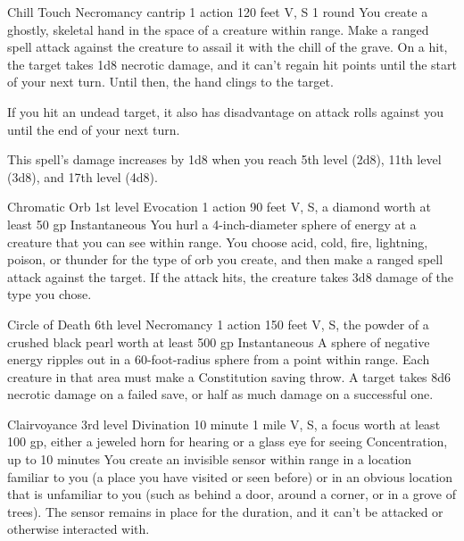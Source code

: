 \documentclass[10pt,a4paper,twoside,bg=print,twocolumn,openany,nodeprecatedcode]{dndbook}
\begin{document}


\DndSpellHeader%
{Chill Touch}
{Necromancy cantrip}
{1 action}
{120 feet}
{V, S}
{1 round}
You create a ghostly, skeletal hand in the space of a creature within range. Make a ranged spell attack against the creature to assail it with the chill of the grave. On a hit, the target takes 1d8 necrotic damage, and it can't regain hit points until the start of your next turn. Until then, the hand clings to the target.

If you hit an undead target, it also has disadvantage on attack rolls against you until the end of your next turn.

This spell's damage increases by 1d8 when you reach 5th level (2d8), 11th level (3d8), and 17th level (4d8).



\DndSpellHeader%
{Chromatic Orb}
{1st level Evocation}
{1 action}
{90 feet}
{V, S, a diamond worth at least 50 gp}
{Instantaneous}
You hurl a 4-inch-diameter sphere of energy at a creature that you can see within range. You choose acid, cold, fire, lightning, poison, or thunder for the type of orb you create, and then make a ranged spell attack against the target. If the attack hits, the creature takes 3d8 damage of the type you chose.



\DndSpellHeader%
{Circle of Death}
{6th level Necromancy}
{1 action}
{150 feet}
{V, S, the powder of a crushed black pearl worth at least 500 gp}
{Instantaneous}
A sphere of negative energy ripples out in a 60-foot-radius sphere from a point within range. Each creature in that area must make a Constitution saving throw. A target takes 8d6 necrotic damage on a failed save, or half as much damage on a successful one.



\DndSpellHeader%
{Clairvoyance}
{3rd level Divination}
{10 minute}
{1 mile}
{V, S, a focus worth at least 100 gp, either a jeweled horn for hearing or a glass eye for seeing}
{Concentration, up to 10 minutes}
You create an invisible sensor within range in a location familiar to you (a place you have visited or seen before) or in an obvious location that is unfamiliar to you (such as behind a door, around a corner, or in a grove of trees). The sensor remains in place for the duration, and it can't be attacked or otherwise interacted with.
\end{document}
